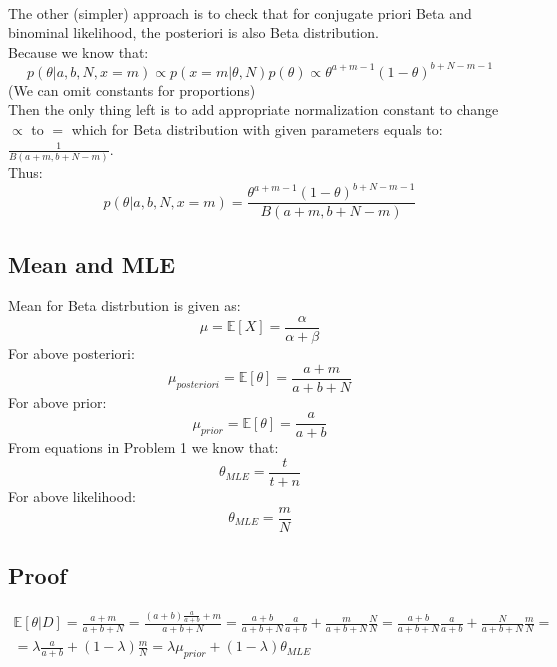 \documentclass{article}
\begin{document}
\\ 
The other (simpler) approach is to check that for conjugate priori Beta and binominal likelihood, the posteriori is also Beta distribution.\\
Because we know that:
\begin{equation}
p(\theta | a, b, N, x = m) \propto  p(x = m|\theta, N) p(\theta) \propto  \theta^{a + m - 1}(1-\theta)^{b + N - m - 1}
\end{equation}
(We can omit constants for proportions)\\
Then the only thing left is to add appropriate normalization constant to change $\propto$ to $=$ which for Beta distribution 
with given parameters equals to: $\frac{1}{B(a+m, b+N-m)}$. \\
Thus:\\

\begin{equation}
p(\theta | a, b, N, x = m) = \frac{ \theta^{a + m - 1}(1-\theta)^{b + N - m - 1}}{B(a+m, b+N-m)}
\end{equation}
\subsection{Mean and MLE}
Mean for Beta distrbution is given as:
\begin{equation}
    \mu = \mathbb{E}[X] = \frac{\alpha}{\alpha+\beta} 
\end{equation}
For above posteriori:
\begin{equation}
    \mu_{posteriori} = \mathbb{E}[\theta] = \frac{a+m}{a+b+N} 
\end{equation}
For above prior:
\begin{equation}
    \mu_{prior} = \mathbb{E}[\theta] = \frac{a}{a+b} 
\end{equation}
From equations in Problem 1 we know that:
\begin{equation}
    \theta_{MLE} = \frac{t}{t+n} 
\end{equation}
For above likelihood:
\begin{equation}
    \theta_{MLE} = \frac{m}{N} 
\end{equation}
\subsection{Proof}
\begin{multline}
    \mathbb{E}[\theta|D] = \frac{a+m}{a+b+N} = \frac{(a+b)\frac{a}{a+b}+m}{a+b+N} =  \frac{a+b}{a+b+N} \frac{a}{a+b} +  \frac{m}{a+b+N} \frac{N}{N} =
    \frac{a+b}{a+b+N} \frac{a}{a+b} +  \frac{N}{a+b+N} \frac{m}{N} =\\
    = \lambda\frac{a}{a+b} + (1-\lambda)\frac{m}{N} = \lambda\mu_{prior} + (1-\lambda)\theta_{MLE}
\end{multline}
\end{document}
